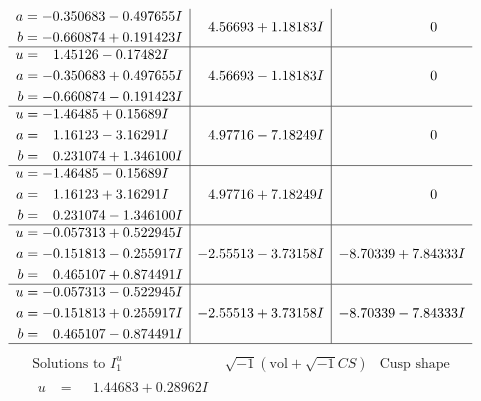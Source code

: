 \documentclass[1p]{elsarticle_modified}
\theoremstyle{definition}
\newcommand{\I}{\sqrt{-1}}
\begin{document}
$$\begin{array}{c|c|c}
\begin{aligned}
a &= -0.350683 - 0.497655 I \\
b &= -0.660874 + 0.191423 I\end{aligned}
 & \phantom{-}4.56693 + 1.18183 I & \phantom{-0.000000 } 0 \\ \hline\begin{aligned}
u &= \phantom{-}1.45126 - 0.17482 I \\
a &= -0.350683 + 0.497655 I \\
b &= -0.660874 - 0.191423 I\end{aligned}
 & \phantom{-}4.56693 - 1.18183 I & \phantom{-0.000000 } 0 \\ \hline\begin{aligned}
u &= -1.46485 + 0.15689 I \\
a &= \phantom{-}1.16123 - 3.16291 I \\
b &= \phantom{-}0.231074 + 1.346100 I\end{aligned}
 & \phantom{-}4.97716 - 7.18249 I & \phantom{-0.000000 } 0 \\ \hline\begin{aligned}
u &= -1.46485 - 0.15689 I \\
a &= \phantom{-}1.16123 + 3.16291 I \\
b &= \phantom{-}0.231074 - 1.346100 I\end{aligned}
 & \phantom{-}4.97716 + 7.18249 I & \phantom{-0.000000 } 0 \\ \hline\begin{aligned}
u &= -0.057313 + 0.522945 I \\
a &= -0.151813 - 0.255917 I \\
b &= \phantom{-}0.465107 + 0.874491 I\end{aligned}
 & -2.55513 - 3.73158 I & -8.70339 + 7.84333 I \\ \hline\begin{aligned}
u &= -0.057313 - 0.522945 I \\
a &= -0.151813 + 0.255917 I \\
b &= \phantom{-}0.465107 - 0.874491 I\end{aligned}
 & -2.55513 + 3.73158 I & -8.70339 - 7.84333 I\\
 \hline 
 \end{array}$$\newpage$$\begin{array}{c|c|c}  
\text{Solutions to }I^u_{1}& \I (\text{vol} + \sqrt{-1}CS) & \text{Cusp shape}\\
 \hline 
\begin{aligned}
u &= \phantom{-}1.44683 + 0.28962 I \\

\end{aligned}
\end{array}$$
\end{document}
